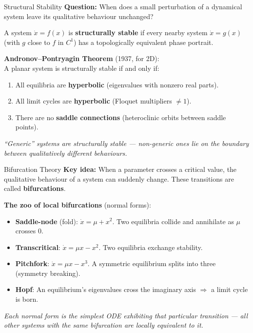 
\begin{frame}{Structural Stability}
\textbf{Question:} When does a small perturbation of a dynamical system leave its qualitative behaviour unchanged?

\vspace{0.3cm}
A system $\dot{x} = f(x)$ is \textbf{structurally stable} if every nearby system $\dot{x} = g(x)$ (with $g$ close to $f$ in $C^1$) has a topologically equivalent phase portrait.

\vspace{0.3cm}
\textbf{Andronov--Pontryagin Theorem} (1937, for 2D): \\
A planar system is structurally stable if and only if:
\begin{enumerate}
    \item All equilibria are \textbf{hyperbolic} (eigenvalues with nonzero real parts).
    \item All limit cycles are \textbf{hyperbolic} (Floquet multipliers $\neq 1$).
    \item There are no \textbf{saddle connections} (heteroclinic orbits between saddle points).
\end{enumerate}

\vspace{0.2cm}
\textit{``Generic'' systems are structurally stable --- non-generic ones lie on the boundary between qualitatively different behaviours.}
\end{frame}


\begin{frame}{Bifurcation Theory}
\textbf{Key idea:} When a parameter crosses a critical value, the qualitative behaviour of a system can suddenly change. These transitions are called \textbf{bifurcations}.

\vspace{0.3cm}
\textbf{The zoo of local bifurcations} (normal forms):
\begin{itemize}
    \item \textbf{Saddle-node} (fold): $\dot{x} = \mu + x^2$.
        Two equilibria collide and annihilate as $\mu$ crosses $0$.
    \item \textbf{Transcritical}: $\dot{x} = \mu x - x^2$.
        Two equilibria exchange stability.
    \item \textbf{Pitchfork}: $\dot{x} = \mu x - x^3$.
        A symmetric equilibrium splits into three (symmetry breaking).
    \item \textbf{Hopf}: An equilibrium's eigenvalues cross the imaginary axis $\Rightarrow$ a limit cycle is born.
\end{itemize}

\vspace{0.2cm}
\textit{Each normal form is the simplest ODE exhibiting that particular transition --- all other systems with the same bifurcation are locally equivalent to it.}
\end{frame}


